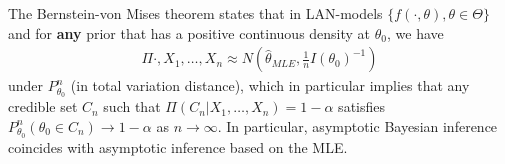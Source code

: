 \begin{thm}
  \label{defn:bayesian_inference:1}
  The Bernstein-von Mises theorem states that in LAN-models $\{
  f(\cdot, \theta), \theta \in \Theta \}$ and for \textbf{any} prior
  that has a positive continuous density at $\theta_{0}$, we have
  \begin{align}
    \label{eq:100}
    \Pi{\cdot, X_{1}, \dots, X_{n}} \approx N(\hat \theta_{MLE}, \frac{1}{n}I(\theta_{0})^{-1})
  \end{align} under $P_{\theta_{0}}^{n}$ (in total variation
  distance), which in particular implies that any credible set $C_{n}$
  such that $\Pi(C_{n} | X_{1}, \dots, X_{n}) = 1 - \alpha$ satisfies
  $P_{\theta_{0}}^{n}(\theta_{0} \in C_{n}) \rightarrow 1 - \alpha$ as
  $n \rightarrow \infty$.  In particular, asymptotic Bayesian inference
  coincides with asymptotic inference based on the MLE.
\end{thm}


